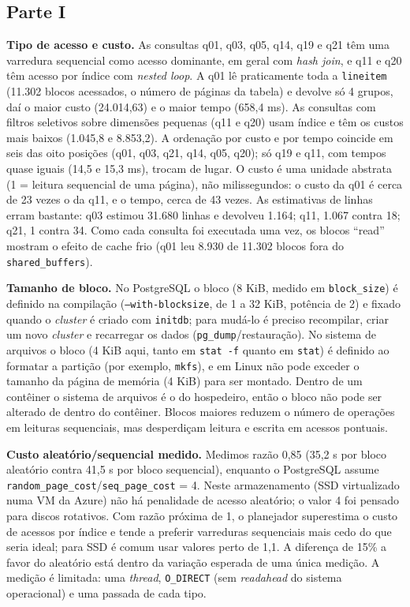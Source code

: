 \documentclass[11pt,a4paper]{article}
\newcommand{\tp}[1]{\texttt{#1}}
\begin{document}
\subsection*{Parte I}
\textbf{Tipo de acesso e custo.} As consultas q01, q03, q05, q14, q19 e q21 têm uma varredura sequencial como acesso dominante, em geral com \emph{hash join}, e q11 e q20 têm acesso por índice com \emph{nested loop}. A q01 lê praticamente toda a \tp{lineitem} (11.302 blocos acessados, o número de páginas da tabela) e devolve só 4 grupos, daí o maior custo (24.014,63) e o maior tempo (658,4 ms). As consultas com filtros seletivos sobre dimensões pequenas (q11 e q20) usam índice e têm os custos mais baixos (1.045,8 e 8.853,2). A ordenação por custo e por tempo coincide em seis das oito posições (q01, q03, q21, q14, q05, q20); só q19 e q11, com tempos quase iguais (14,5 e 15,3 ms), trocam de lugar. O custo é uma unidade abstrata (1 = leitura sequencial de uma página), não milissegundos: o custo da q01 é cerca de 23 vezes o da q11, e o tempo, cerca de 43 vezes. As estimativas de linhas erram bastante: q03 estimou 31.680 linhas e devolveu 1.164; q11, 1.067 contra 18; q21, 1 contra 34. Como cada consulta foi executada uma vez, os blocos ``read'' mostram o efeito de cache frio (q01 leu 8.930 de 11.302 blocos fora do \tp{shared\_buffers}).

\textbf{Tamanho de bloco.} No PostgreSQL o bloco (8 KiB, medido em \tp{block\_size}) é definido na compilação (\tp{--with-blocksize}, de 1 a 32 KiB, potência de 2) e fixado quando o \emph{cluster} é criado com \tp{initdb}; para mudá-lo é preciso recompilar, criar um novo \emph{cluster} e recarregar os dados (\tp{pg\_dump}/restauração). No sistema de arquivos o bloco (4 KiB aqui, tanto em \tp{stat -f} quanto em \tp{stat}) é definido ao formatar a partição (por exemplo, \tp{mkfs}), e em Linux não pode exceder o tamanho da página de memória (4 KiB) para ser montado. Dentro de um contêiner o sistema de arquivos é o do hospedeiro, então o bloco não pode ser alterado de dentro do contêiner. Blocos maiores reduzem o número de operações em leituras sequenciais, mas desperdiçam leitura e escrita em acessos pontuais.

\textbf{Custo aleatório/sequencial medido.} Medimos razão 0,85 (35,2 \textmu s por bloco aleatório contra 41,5 \textmu s por bloco sequencial), enquanto o PostgreSQL assume \tp{random\_page\_cost}/\tp{seq\_page\_cost} = 4. Neste armazenamento (SSD virtualizado numa VM da Azure) não há penalidade de acesso aleatório; o valor 4 foi pensado para discos rotativos. Com razão próxima de 1, o planejador superestima o custo de acessos por índice e tende a preferir varreduras sequenciais mais cedo do que seria ideal; para SSD é comum usar valores perto de 1,1. A diferença de 15\% a favor do aleatório está dentro da variação esperada de uma única medição. A medição é limitada: uma \emph{thread}, \tp{O\_DIRECT} (sem \emph{readahead} do sistema operacional) e uma passada de cada tipo.
\end{document}
